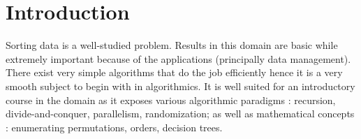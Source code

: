 \section{Introduction}
\label{tree:sorting:intro}

Sorting data is a well-studied problem. Results in this domain are basic while extremely important because of the applications (principally data management).
There exist very simple algorithms that do the job efficiently hence it is a very smooth subject to begin with in algorithmics.
It is well suited for an introductory course in the domain as it exposes various algorithmic paradigms : recursion, divide-and-conquer, parallelism, randomization; as well as mathematical concepts : enumerating permutations, orders, decision trees.

